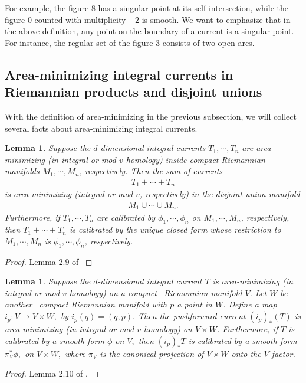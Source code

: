 \documentclass[11pt,a4paper]{amsart}
\numberwithin{equation}{section}
\newcommand{\cd}{\cdots}
\newcommand{\du}{^\ast}
\newcommand{\pf}{_\ast}
\theoremstyle{plain}
\newtheorem{lem}[exam]{Lemma}
\theoremstyle{definition}
\numberwithin{equation}{subsection}
\begin{document}
	For example, the figure $8$ has a singular point at its self-intersection, while the figure $0$ counted with multiplicity $-2$ is smooth. We want to emphasize that in the above definition, any point on the boundary of a current is a singular point. For instance, the regular set of the figure $3$ consists of two open arcs.
	\subsection{Area-minimizing integral currents in Riemannian products and disjoint unions}\label{basdis}
	With the definition of area-minimizing in the previous subsection, we will collect several facts about area-minimizing integral currents.
	\begin{lem}\label{lemdis}
		Suppose the $d$-dimensional integral currents $T_1,\cd,T_n$ are area-minimizing (in integral or mod $v$ homology) inside compact Riemannian manifolds $M_1,\cd,M_n$, respectively. Then the sum of currents
		\begin{align*}
			T_1+\cd+T_n
		\end{align*}
		is area-minimizing (integral or mod $v$, respectively) in the disjoint union manifold
		\begin{align*}
			M_1\cup\cd \cup M_n.
		\end{align*}
		Furthermore, if $T_1,\cd,T_n$ are calibrated by $\phi_1,\cd,\phi_n$ on $M_1,\cd,M_n$, respectively, then $T_1+\cd+T_n$ is calibrated by the unique closed form whose restriction to $M_1,\cd,M_n$ is $\phi_1,\cd,\phi_n$, respectively. 
	\end{lem}
	\begin{proof}
		Lemma 2.9 of \cite{ZLa}\end{proof}
	\begin{lem}\label{lemprod}
		Suppose the $d$-dimensional integral current $T$ is area-minimizing (in integral or mod $v$ homology) on a compact  Riemannian manifold $V$. Let $W$ be another  compact Riemannian manifold with $p$ a point in $W$. Define a map $i_p:V\to V\times W,$ by
		$		i_p(q)=(q,p).
		$	Then the pushforward current $
		(i_p)\pf(T)$
		is area-minimizing (in integral or mod $v$ homology) on $V\times W$. Furthermore, if $T$ is calibrated by a smooth form $\phi$ on $V,$ then $(i_p)\pf T$ is calibrated by a smooth form $		\pi_V\du\phi,$ on $V\times W,$ where $\pi_V$ is the canonical projection of $V\times W$ onto the $V$ factor.
	\end{lem}
	\begin{proof}
		Lemma 2.10 of \cite{ZLa}.\end{proof}
\end{document}
